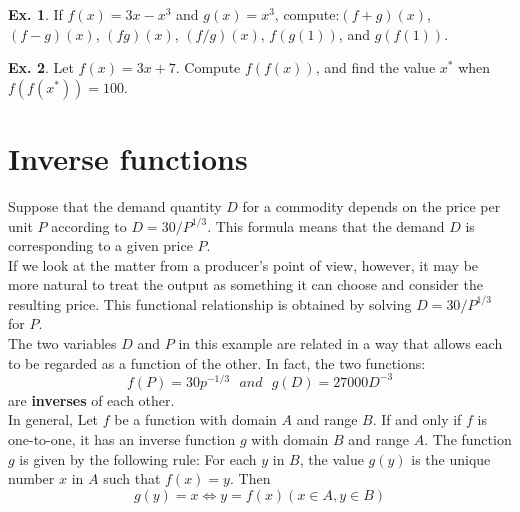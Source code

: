 \documentclass[10pt,a4paper]{book}
\theoremstyle{definition}\newtheorem{definition}{Definition}
\theoremstyle{definition}\newtheorem{fact}{Fact}
\theoremstyle{definition}\newtheorem{ex}{Ex.}
\theoremstyle{definition}\newtheorem{project}{Project}
\theoremstyle{definition}\newtheorem{problem}{Problem}
\theoremstyle{definition}\newtheorem{example}{Example}
\numberwithin{theorem}{chapter}
\numberwithin{corollary}{chapter}
\numberwithin{assumption}{chapter}
\numberwithin{definition}{chapter}
\numberwithin{prop}{chapter}
\numberwithin{notation}{chapter}
\numberwithin{problem}{chapter}
\numberwithin{example}{chapter}
\numberwithin{fact}{chapter}
\numberwithin{ex}{chapter}
\begin{document}
	\begin{ex}
		If $f(x)=3x-x^3$ and $g(x)=x^3$, compute:$(f+g)(x)$, $(f - g)(x)$, $(fg)(x)$, $(f/g)(x)$, $f(g(1))$, and $g(f(1))$.
	\end{ex}
	
	\begin{ex}
		Let $f(x) = 3x + 7$. Compute $f(f(x))$, and find the value $x^*$ when $f(f(x^*)) = 100$.
	\end{ex}
	
	\section{Inverse functions}
	Suppose that the demand quantity $D$ for a commodity depends on the price per unit $P$ according to $D = 30/P^{1/3}$. This formula means that the demand $D$ is corresponding to a given price $P$. 
	\\
	If we look at the matter from a producer’s point of view, however, it may be more natural to treat the output as something it can choose and consider the resulting price. This functional relationship is obtained by solving $D = 30/P^{1/3}$ for $P$.
	\\
	The two variables $D$ and $P$ in this example are related in a way that allows each to be regarded as a function of the other. In fact, the two functions:
	$$f (P) = 30p^{-1/3} \,\,\,\,and\,\,\,\, g(D) = 27000D^{-3}$$
	are \textbf{inverses} of each other.
	\\
	In general, Let $f$ be a function with domain $A$ and range $B$. If and only if $f$ is one-to-one, it has an inverse function $g$ with domain $B$ and range $A$. The function $g$ is given by the following rule: For each $y$ in $B$, the value $g(y)$ is the unique number $x$ in $A$ such that $f (x) = y$. Then
	$$g(y)=x\Leftrightarrow y=f(x)(x\in A, y\in B)$$
	
\end{document}
